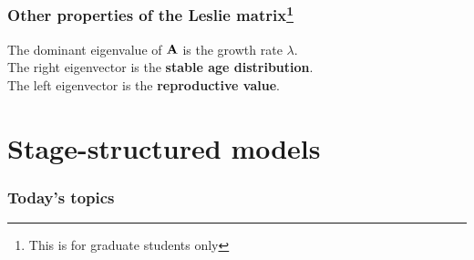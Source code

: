 \documentclass[color=usenames,dvipsnames]{beamer}\usepackage[]{graphicx}\usepackage[]{color}
\begin{document}
\begin{frame}
  \frametitle{Other properties of the Leslie matrix\footnote{This is
      for graduate students only}}
  \large
  The dominant eigenvalue of ${\bf A}$ is the growth rate $\lambda$. \\
  \pause
  \vfill
  The right eigenvector is the {\bf stable age distribution}. \\
  \pause
  \vfill
  The left eigenvector is the {\bf reproductive value}. \\
\end{frame}





\section{Stage-structured models}



\begin{frame}[plain]
  \frametitle{Today's topics}
  \tableofcontents[currentsection]
\end{frame}
\end{document}
